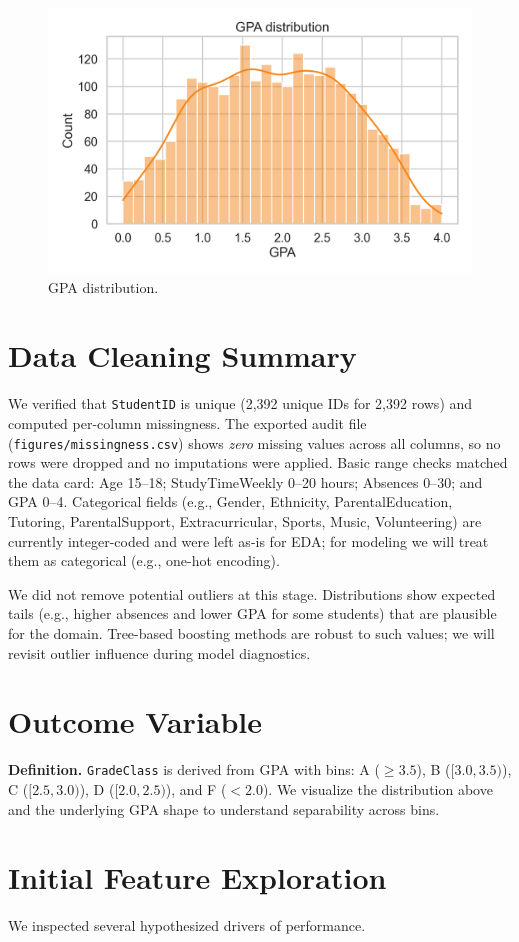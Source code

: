 \documentclass[11pt]{article}
\begin{document}
\begin{figure}[H]
	\centering
	\includegraphics[width=.65\textwidth]{figures/gpa_histogram.png}
	\caption{GPA distribution.}\label{fig:gpa-hist}
\end{figure}

\section*{Data Cleaning Summary}
We verified that \texttt{StudentID} is unique (2{,}392 unique IDs for 2{,}392 rows) and computed per-column missingness. The exported audit file (\texttt{figures/missingness.csv}) shows \emph{zero} missing values across all columns, so no rows were dropped and no imputations were applied. Basic range checks matched the data card: Age 15--18; StudyTimeWeekly 0--20 hours; Absences 0--30; and GPA 0--4. Categorical fields (e.g., Gender, Ethnicity, ParentalEducation, Tutoring, ParentalSupport, Extracurricular, Sports, Music, Volunteering) are currently integer-coded and were left as-is for EDA; for modeling we will treat them as categorical (e.g., one-hot encoding).

We did not remove potential outliers at this stage. Distributions show expected tails (e.g., higher absences and lower GPA for some students) that are plausible for the domain. Tree-based boosting methods are robust to such values; we will revisit outlier influence during model diagnostics.

\section*{Outcome Variable}
	\textbf{Definition.} \texttt{GradeClass} is derived from GPA with bins: A ($\geq 3.5$), B ($[3.0,3.5)$), C ($[2.5,3.0)$), D ($[2.0,2.5)$), and F ($<2.0$). We visualize the distribution above and the underlying GPA shape to understand separability across bins.

\section*{Initial Feature Exploration}
We inspected several hypothesized drivers of performance.
\end{document}
